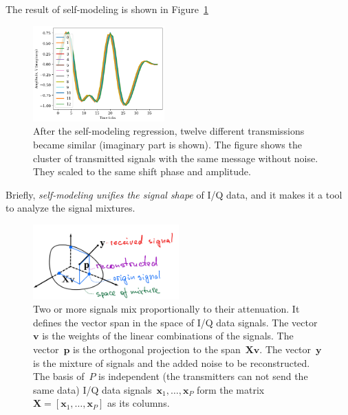 \documentclass[12pt]{article}
\begin{document}

The result of self-modeling is shown in Figure~\ref{fig:cluster}
\begin{figure}[!tp]
\centering
\includegraphics[width=0.45\textwidth]{fig_cluster}
\caption{After the self-modeling regression, twelve different transmissions became similar (imaginary part is shown). The figure shows the cluster of transmitted signals with the same message without noise. They scaled to the same shift phase and amplitude. }
\label{fig:cluster}
\end{figure}

Briefly, \emph{self-modeling unifies the signal shape} of  I/Q data, and it makes it a tool to analyze the signal mixtures. 
 
\begin{figure}[!t]
\centering
\includegraphics[width=0.5\textwidth]{fig_LSProj_hand}
\caption{Two or more signals mix proportionally to their attenuation. It defines the vector span in the space of I/Q data signals. The vector~$\mathbf{v}$ is the weights of the linear combinations of the signals. The vector~$\mathbf{p}$ is the orthogonal projection to the span~$\mathbf{X}\mathbf{v}$. The vector~$\mathbf{y}$ is the mixture of signals and the added noise to be reconstructed. The basis of~$P$ is independent (the transmitters can not send the same data) I/Q data 
signals~$\mathbf{x}_1,\ldots,\mathbf{x}_P$ form the matrix~$\mathbf{X}=[\mathbf{x}_1,\ldots,\mathbf{x}_P]$ as its columns.}
\label{fig:lsq}
\end{figure}
\end{document}
